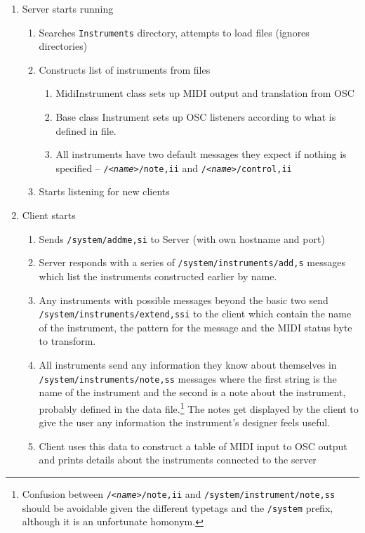\documentclass[11pt]{article}
\begin{document}
\begin{flushleft}
\begin{enumerate}[\bf1.]
	\item Server starts running
	\begin{enumerate} [\bf a.]                          
		\item Searches \texttt{Instruments} directory, attempts to load files (ignores directories)
		\item Constructs list of instruments from files
		\begin{enumerate}
			\item MidiInstrument class sets up MIDI output and translation from OSC
			\item Base class Instrument sets up OSC listeners according to what is defined in file.
			\item All instruments have two default messages they expect if nothing is specified -- \texttt{/\textit{<name>}/note,ii} and 
				 \texttt{/\textit{<name>}/control,ii} 
		\end{enumerate}
		\item Starts listening for new clients
	 \end{enumerate}
	 \item Client starts 
	 \begin{enumerate} [\bf a.]
	 	\item Sends \texttt{/system/addme,si} to Server (with own hostname and port)
		\item Server responds with a series of \texttt{/system/instruments/add,s} messages which list the instruments constructed earlier by name.
		\item Any instruments with possible messages beyond the basic two send 
			 \texttt{/system/instruments/extend,ssi} to the client
			which contain the name of the instrument, the pattern for the message and the MIDI status byte to transform.
		\item All instruments send any information they know about themselves in \texttt{/system/instruments/note,ss} messages where the first 
			string is the name of the instrument and the second is a note about the instrument, probably defined in the data file.\footnote{Confusion
			between \texttt{/\textit{<name>}/note,ii} and \texttt{/system/instrument/note,ss} should be avoidable given the different typetags and the 
			\texttt{/system} prefix, although it is an unfortunate homonym.} The notes get displayed by the client to give the user any information
			the instrument's designer feels useful.
		\item Client uses this data to construct a table of MIDI input to OSC output and prints details about the instruments connected to the server

\end{enumerate}
\end{enumerate}
\end{flushleft}
\end{document}
